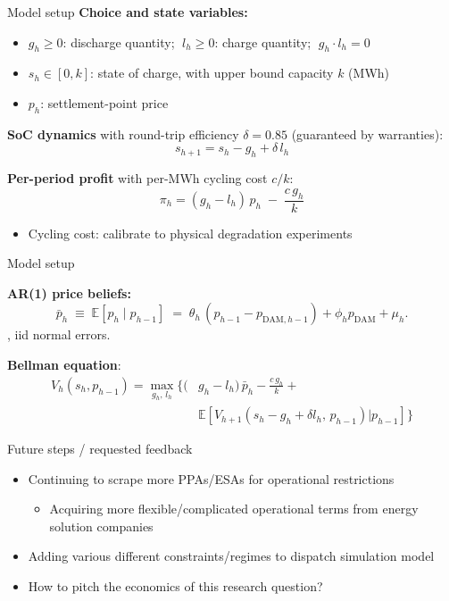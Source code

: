 \documentclass{beamer}
\begin{document}
\begin{frame}{Model setup}
\textbf{Choice and state variables:}
\begin{itemize}
    \item $g_h \geq 0$: discharge quantity; $\;l_h \geq 0$: charge quantity; $\;g_h \cdot l_h = 0$
    \item $s_h \in [0, k]$: state of charge, with upper bound capacity $k$ (MWh)
    \item $p_h$: settlement-point price
\end{itemize}

\vspace{0.2cm}
\textbf{SoC dynamics} with round-trip efficiency $\delta = 0.85$ (guaranteed by warranties):
\[
s_{h+1} = s_h - g_h + \delta\, l_h
\]

\textbf{Per-period profit} with per-MWh cycling cost $c/k$:
\[
\pi_h = (g_h - l_h)\,p_h \;-\; \frac{c\,g_h}{k}
\]
\begin{itemize}
    \item Cycling cost: calibrate to physical degradation experiments
\end{itemize}

\end{frame}

\begin{frame}{Model setup}


\textbf{AR(1) price beliefs:}
\[
\bar p_h \;\equiv\; \mathbb{E}[p_h\mid p_{h-1}] \;=\; \theta_h\, (p_{h-1} - p_{\text{DAM}, h-1}) + \phi_h p_{\text{DAM}} + \mu_h.
\], iid normal errors.

\vspace{0.2cm}
\textbf{Bellman equation}: 
\begin{align*}
    V_h(s_h, p_{h-1}) =  \max_{g_h,\,l_h}\Big\{(&g_h - l_h)\,\bar p_h - \tfrac{c\,g_h}{k} + \\ &\mathbb{E}[ V_{h+1}(s_h - g_h + \delta l_h,\, p_{h-1}) | p_{h-1}]\Big\}
\end{align*}

\end{frame}

\begin{frame}{Future steps / requested feedback}
    \begin{itemize}
        \item Continuing to scrape more PPAs/ESAs for operational restrictions
        \begin{itemize}
            \item Acquiring more flexible/complicated operational terms from energy solution companies
        \end{itemize}
        \item Adding various different constraints/regimes to dispatch simulation model
        \item How to pitch the economics of this research question?
    \end{itemize}
\end{frame}
\end{document}
